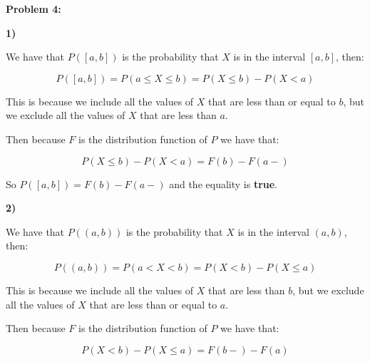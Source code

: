 \textbf{Problem 4:}

\singlespacing

\textbf{1)}

\singlespacing

We have that $P([a, b])$ is the probability that $X$ is in the interval $[a, b]$, then:

\singlespacing

\begin{equation}
    P([a, b]) = P(a \leq X \leq b) = P(X \leq b) - P(X < a)
\end{equation}

\singlespacing

This is because we include all the values of $X$ that are less than or equal to $b$,
but we exclude all the values of $X$ that are less than $a$.

\singlespacing

Then because $F$ is the distribution function of $P$ we have that:

\singlespacing

\begin{equation}
    P(X \leq b) - P(X < a) = F(b) - F(a -)
\end{equation}

\singlespacing

So $P([a, b]) = F(b) - F(a -)$ and the equality is \textbf{true}.

\singlespacing
\singlespacing
\singlespacing

\textbf{2)}

\singlespacing

We have that $P((a, b))$ is the probability that $X$ is in the interval $(a, b)$, then:

\singlespacing

\begin{equation}
    P((a, b)) = P(a < X < b) = P(X < b) - P(X \leq a)
\end{equation}

\singlespacing

This is because we include all the values of $X$ that are less than $b$,
but we exclude all the values of $X$ that are less than or equal to $a$.

\singlespacing

Then because $F$ is the distribution function of $P$ we have that:

\singlespacing

\begin{equation}
    P(X < b) - P(X \leq a) = F(b-) - F(a)
\end{equation}


